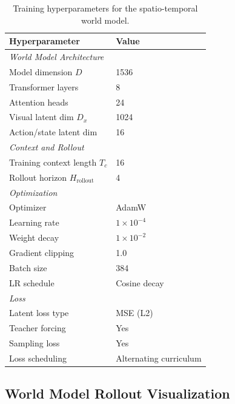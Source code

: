\begin{table}[h]
\centering
\small
\begin{tabular}{l l}
\toprule
\textbf{Hyperparameter} & \textbf{Value} \\
\midrule

\multicolumn{2}{l}{\textit{World Model Architecture}} \\
Model dimension $D$ & 1536 \\
Transformer layers & 8 \\
Attention heads & 24 \\
Visual latent dim $D_x$ & 1024 \\
Action/state latent dim & 16 \\


\midrule
\multicolumn{2}{l}{\textit{Context and Rollout}} \\
Training context length $T_c$ & 16 \\
Rollout horizon $H_{\text{rollout}}$ & 4 \\

\midrule
\multicolumn{2}{l}{\textit{Optimization}} \\
Optimizer & AdamW \\
Learning rate & $1\times10^{-4}$ \\
Weight decay & $1\times10^{-2}$ \\
Gradient clipping & 1.0 \\
Batch size  & 384 \\
LR schedule & Cosine decay \\

\midrule
\multicolumn{2}{l}{\textit{Loss}} \\
Latent loss type & MSE (L2) \\
Teacher forcing & Yes \\
Sampling loss & Yes \\
Loss scheduling & Alternating curriculum \\



\bottomrule
\end{tabular}
\caption{Training hyperparameters for the spatio-temporal world model.}
\label{tab:training-hparams}
\end{table}





\subsection{World Model Rollout Visualization}
\label{sec:supp-rollout-vis}

